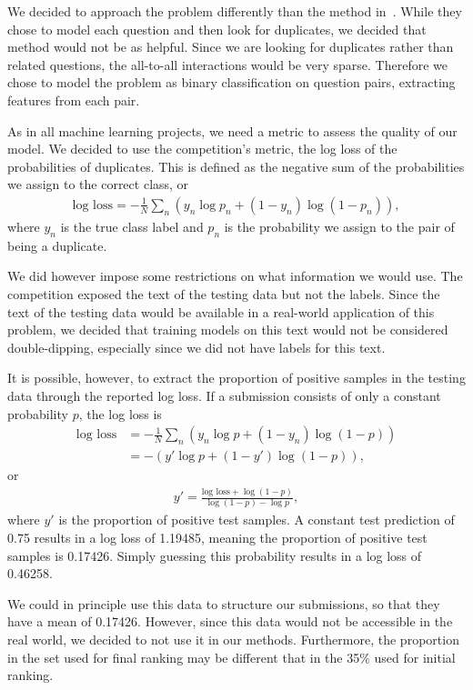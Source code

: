 \documentclass{article} %
\begin{document}
	We decided to approach the problem differently than the method in~\cite{Zhang2015}. While they chose to model each question and then look for duplicates, we decided that method would not be as helpful. Since we are looking for duplicates rather than related questions, the all-to-all interactions would be very sparse. Therefore we chose to model the problem as binary classification on question pairs, extracting features from each pair. 
	
	As in all machine learning projects, we need a metric to assess the quality of our model. We decided to use the competition's metric, the log loss of the probabilities of duplicates. This is defined as the negative sum of the probabilities we assign to the correct class, or
	\begin{align}
	\text{log loss} = -\frac{1}{N}\sum_n \left(y_n\log p_n + (1-y_n)\log(1-p_n)\right),
	\end{align} 
	where $y_n$ is the true class label and $p_n$ is the probability we assign to the pair of being a duplicate. 
	
	We did however impose some restrictions on what information we would use. The competition exposed the text of the testing data but not the labels. Since the text of the testing data would be available in a real-world application of this problem, we decided that training models on this text would not be considered double-dipping, especially since we did not have labels for this text. 
	
	It is possible, however, to extract the proportion of positive samples in the testing data through the reported log loss. If a submission consists of only a constant probability $p$, the log loss is
	\begin{align}
	\text{log loss} &= -\frac{1}{N}\sum_n \left(y_n\log p + (1-y_n)\log(1-p)\right)
	\nonumber\\
	&= -\left(y'\log p + (1-y')\log(1-p)\right),
	\end{align}
	or 
	\begin{align}
	y' = \frac{\text{log loss} + \log(1-p)}{\log(1-p)-\log p},
	\end{align}
	where $y'$ is the proportion of positive test samples. A constant test prediction of 0.75 results in a log loss of 1.19485, meaning the proportion of positive test samples is 0.17426. Simply guessing this probability results in a log loss of 0.46258. 
	
	We could in principle use this data to structure our submissions, so that they have a mean of 0.17426. However, since this data would not be accessible in the real world, we decided to not use it in our methods. Furthermore, the proportion in the set used for final ranking may be different that in the 35\% used for initial ranking.
	
\end{document}
